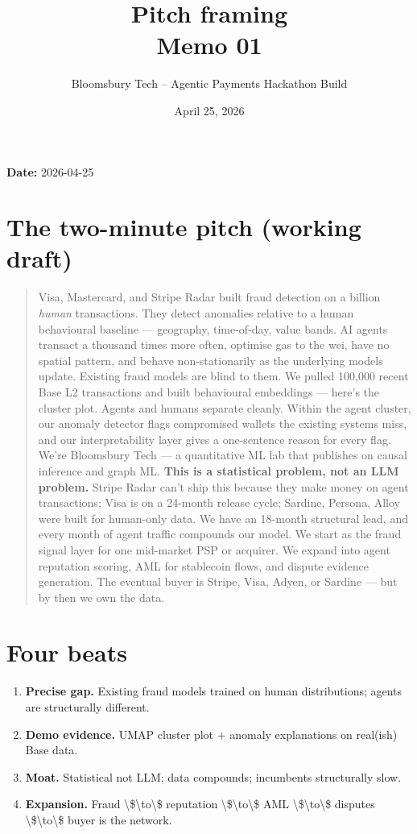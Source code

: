 \documentclass[11pt]{article}
\title{\textbf{Pitch framing}\\
\large Memo 01}
\author{Bloomsbury Tech -- Agentic Payments Hackathon Build}
\date{April 25, 2026}
\begin{document}
\maketitle

\textbf{Date:} 2026-04-25

\section{The two-minute pitch (working draft)}
\begin{quote}
Visa, Mastercard, and Stripe Radar built fraud detection on a billion \emph{human} transactions. They detect anomalies relative to a human behavioural baseline --- geography, time-of-day, value bands. AI agents transact a thousand times more often, optimise gas to the wei, have no spatial pattern, and behave non-stationarily as the underlying models update. Existing fraud models are blind to them.  We pulled 100,000 recent Base L2 transactions and built behavioural embeddings --- here's the cluster plot. Agents and humans separate cleanly. Within the agent cluster, our anomaly detector flags compromised wallets the existing systems miss, and our interpretability layer gives a one-sentence reason for every flag.  We're Bloomsbury Tech --- a quantitative ML lab that publishes on causal inference and graph ML. \textbf{This is a statistical problem, not an LLM problem.} Stripe Radar can't ship this because they make money on agent transactions; Visa is on a 24-month release cycle; Sardine, Persona, Alloy were built for human-only data. We have an 18-month structural lead, and every month of agent traffic compounds our model.  We start as the fraud signal layer for one mid-market PSP or acquirer. We expand into agent reputation scoring, AML for stablecoin flows, and dispute evidence generation. The eventual buyer is Stripe, Visa, Adyen, or Sardine --- but by then we own the data.
\end{quote}
\section{Four beats}
\begin{enumerate}
  \item \textbf{Precise gap.} Existing fraud models trained on human distributions; agents are structurally different.
  \item \textbf{Demo evidence.} UMAP cluster plot + anomaly explanations on real(ish) Base data.
  \item \textbf{Moat.} Statistical not LLM; data compounds; incumbents structurally slow.
  \item \textbf{Expansion.} Fraud \textbackslash{}\$\textbackslash{}to\textbackslash{}\$ reputation \textbackslash{}\$\textbackslash{}to\textbackslash{}\$ AML \textbackslash{}\$\textbackslash{}to\textbackslash{}\$ disputes \textbackslash{}\$\textbackslash{}to\textbackslash{}\$ buyer is the network.
\end{enumerate}
\end{document}
